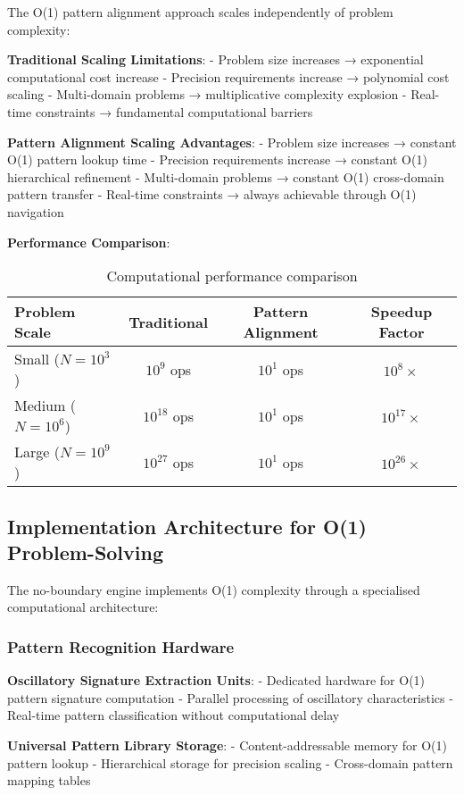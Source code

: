 \documentclass[11pt,a4paper]{article}
\theoremstyle{remark}
\begin{document}
The O(1) pattern alignment approach scales independently of problem complexity:

\textbf{Traditional Scaling Limitations}:
- Problem size increases → exponential computational cost increase
- Precision requirements increase → polynomial cost scaling  
- Multi-domain problems → multiplicative complexity explosion
- Real-time constraints → fundamental computational barriers

\textbf{Pattern Alignment Scaling Advantages}:
- Problem size increases → constant O(1) pattern lookup time
- Precision requirements increase → constant O(1) hierarchical refinement
- Multi-domain problems → constant O(1) cross-domain pattern transfer
- Real-time constraints → always achievable through O(1) navigation

\textbf{Performance Comparison}:
\begin{table}[H]
\centering
\begin{tabular}{lccc}
\toprule
Problem Scale & Traditional & Pattern Alignment & Speedup Factor \\
\midrule
Small ($N = 10^3$) & $10^9$ ops & $10^1$ ops & $10^8\times$ \\
Medium ($N = 10^6$) & $10^{18}$ ops & $10^1$ ops & $10^{17}\times$ \\
Large ($N = 10^9$) & $10^{27}$ ops & $10^1$ ops & $10^{26}\times$ \\
\bottomrule
\end{tabular}
\caption{Computational performance comparison}
\end{table}

\subsection{Implementation Architecture for O(1) Problem-Solving}

The no-boundary engine implements O(1) complexity through a specialised computational architecture:

\subsubsection{Pattern Recognition Hardware}

\textbf{Oscillatory Signature Extraction Units}:
- Dedicated hardware for O(1) pattern signature computation
- Parallel processing of oscillatory characteristics
- Real-time pattern classification without computational delay

\textbf{Universal Pattern Library Storage}:
- Content-addressable memory for O(1) pattern lookup
- Hierarchical storage for precision scaling
- Cross-domain pattern mapping tables
\end{document}
